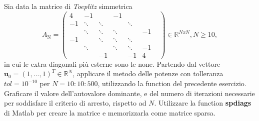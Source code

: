 Sia data la matrice di \textit{Toeplitz} simmetrica $$A_\mathrm{N}=\begin{pmatrix}
    4 & -1 & & -1 & & &\\
    -1 & \ddots & \ddots & & \ddots & \\
     & \ddots & \ddots &\ddots & & -1\\
     -1 & & \ddots & \ddots & \ddots & \\
     & \ddots & & \ddots & \ddots & -1 \\
     & & -1 & & -1 & 4
\end{pmatrix} \in\mathbb{R}^{NxN}, N\geq10, $$
in cui le extra-diagonali più esterne sono le none. Partendo dal vettore $\textbf{u}_\mathrm{0} = (1,...,1)^{T} \in \mathbb{R}^{N} $, applicare il metodo delle potenze con tolleranza $tol = 10^{-10}$ per $N = 10 : 10 : 500$, utilizzando la function del precedente esercizio. Graficare il valore dell'autovalore dominante, e del numero di iterazioni necessarie per soddisfare il criterio di arresto, rispetto ad $N$. Utilizzare la function \textbf{spdiags} di Matlab per creare la matrice e memorizzarla come matrice sparsa.

